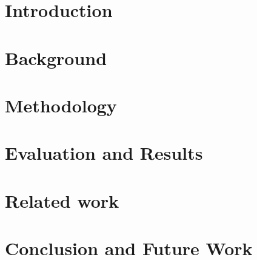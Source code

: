 \chapter{Introduction} \label{Introduction}


\chapter{Background} \label{Background}


\chapter{Methodology} \label{Methodology}


\chapter{Evaluation and Results} \label{Evaluation and Results}


\chapter{Related work} \label{Related work}


\chapter{Conclusion and Future Work} \label{Conclusion and Future Work}



\printbibliography[heading=bibintoc]

% 